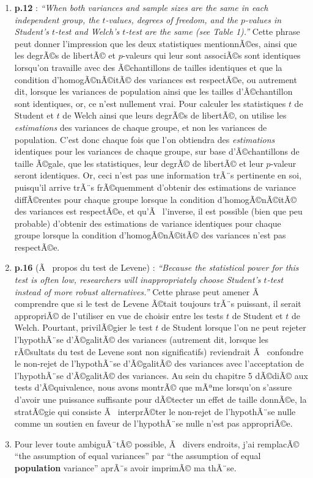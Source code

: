 \begin{appendix}
\begin{enumerate}
\def\labelenumi{\arabic{enumi})}
\item
  \textbf{p.12} : \emph{``When both variances and sample sizes are the
  same in each independent group, the \(t\)-values, degrees of freedom,
  and the \(p\)-values in Student's \(t\)-test and Welch's \(t\)-test
  are the same (see Table 1).''} Cette phrase peut donner l'impression
  que les deux statistiques mentionnÃ©es, ainsi que les degrÃ©s de
  libertÃ© et \(p\)-valeurs qui leur sont associÃ©s sont identiques
  lorsqu'on travaille avec des Ã©chantillons de tailles identiques et
  que la condition d'homogÃ©nÃ©itÃ© des variances est respectÃ©e, ou
  autrement dit, lorsque les variances de population ainsi que les
  tailles d'Ã©chantillon sont identiques, or, ce n'est nullement vrai.
  Pour calculer les statistiques \(t\) de Student et \(t\) de Welch
  ainsi que leurs degrÃ©s de libertÃ©, on utilise les \emph{estimations}
  des variances de chaque groupe, et non les variances de population.
  C'est donc chaque fois que l'on obtiendra des \emph{estimations}
  identiques pour les variances de chaque groupe, sur base
  d'Ã©chantillons de taille Ã©gale, que les statistiques, leur degrÃ© de
  libertÃ© et leur \(p\)-valeur seront identiques. Or, ceci n'est pas
  une information trÃ¨s pertinente en soi, puisqu'il arrive trÃ¨s
  frÃ©quemment d'obtenir des estimations de variance diffÃ©rentes pour
  chaque groupe lorsque la condition d'homogÃ©nÃ©itÃ© des variances est
  respectÃ©e, et qu'Ã~ l'inverse, il est possible (bien que peu
  probable) d'obtenir des estimations de variance identiques pour chaque
  groupe lorsque la condition d'homogÃ©nÃ©itÃ© des variances n'est pas
  respectÃ©e.
\item
  \textbf{p.16} (Ã~ propos du test de Levene) : \emph{``Because the
  statistical power for this test is often low, researchers will
  inappropriately choose Student's \(t\)-test instead of more robust
  alternatives.''} Cette phrase peut amener Ã~ comprendre que si le test
  de Levene Ã©tait toujours trÃ¨s puissant, il serait appropriÃ© de
  l'utiliser en vue de choisir entre les tests \(t\) de Student et \(t\)
  de Welch. Pourtant, privilÃ©gier le test \(t\) de Student lorsque l'on
  ne peut rejeter l'hypothÃ¨se d'Ã©galitÃ© des variances (autrement dit,
  lorsque les rÃ©sultats du test de Levene sont non significatifs)
  reviendrait Ã~ confondre le non-rejet de l'hypothÃ¨se d'Ã©galitÃ© des
  variances avec l'acceptation de l'hypothÃ¨se d'Ã©galitÃ© des
  variances. Au sein du chapitre 5 dÃ©diÃ© aux tests d'Ã©quivalence,
  nous avons montrÃ© que mÃªme lorsqu'on s'assure d'avoir une puissance
  suffisante pour dÃ©tecter un effet de taille donnÃ©e, la stratÃ©gie
  qui consiste Ã~ interprÃ©ter le non-rejet de l'hypothÃ¨se nulle comme
  un soutien en faveur de l'hypothÃ¨se nulle n'est pas appropriÃ©e.
\item
  Pour lever toute ambiguÃ¯tÃ© possible, Ã~ divers endroits, j'ai
  remplacÃ© ``the assumption of equal variances'' par ``the assumption
  of equal \color{blue} \textbf{population} \color{black} variance''
  aprÃ¨s avoir imprimÃ© ma thÃ¨se.
\end{enumerate}


\end{appendix}
